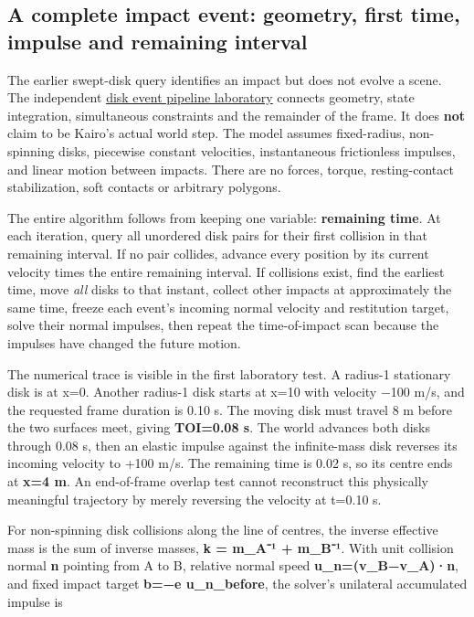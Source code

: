 \subsection{A complete impact event: geometry, first time, impulse and remaining interval}\label{appendix-c9d92e145503-a-complete-impact-event-geometry-first-time-impulse-and-remaining-interval}

The earlier swept-disk query identifies an impact but does not evolve a scene. The independent \hyperref[source-file-ad26f703e8f150d27a72bf93]{disk event pipeline laboratory} connects geometry, state integration, simultaneous constraints and the remainder of the frame. It does \textbf{not} claim to be Kairo's actual world step. The model assumes fixed-radius, non-spinning disks, piecewise constant velocities, instantaneous frictionless impulses, and linear motion between impacts. There are no forces, torque, resting-contact stabilization, soft contacts or arbitrary polygons.

The entire algorithm follows from keeping one variable: \textbf{remaining time}. At each iteration, query all unordered disk pairs for their first collision in that remaining interval. If no pair collides, advance every position by its current velocity times the entire remaining interval. If collisions exist, find the earliest time, move \emph{all} disks to that instant, collect other impacts at approximately the same time, freeze each event's incoming normal velocity and restitution target, solve their normal impulses, then repeat the time-of-impact scan because the impulses have changed the future motion.

The numerical trace is visible in the first laboratory test. A radius-1 stationary disk is at x=0. Another radius-1 disk starts at x=10 with velocity −100 m/s, and the requested frame duration is 0.10 s. The moving disk must travel 8 m before the two surfaces meet, giving \textbf{TOI=0.08 s}. The world advances both disks through 0.08 s, then an elastic impulse against the infinite-mass disk reverses its incoming velocity to +100 m/s. The remaining time is 0.02 s, so its centre ends at \textbf{x=4 m}. An end-of-frame overlap test cannot reconstruct this physically meaningful trajectory by merely reversing the velocity at t=0.10 s.

For non-spinning disk collisions along the line of centres, the inverse effective mass is the sum of inverse masses, \textbf{k = m\_A⁻¹ + m\_B⁻¹}. With unit collision normal \textbf{n} pointing from A to B, relative normal speed \textbf{u\_n=(v\_B−v\_A)·n}, and fixed impact target \textbf{b=−e u\_n\_before}, the solver's unilateral accumulated impulse is

